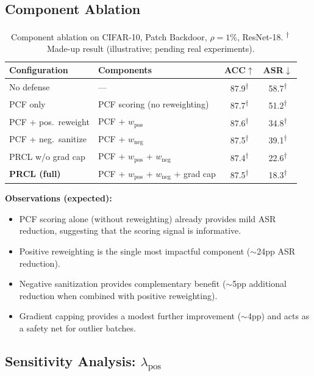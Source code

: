\documentclass[11pt,a4paper]{article}
\newcommand{\madeupresult}[1]{\textcolor{madeup}{#1\textsuperscript{$\dagger$}}}
\newcommand{\daggernote}{\textsuperscript{$\dagger$}\,\textcolor{madeup}{Made-up result (illustrative; pending real experiments).}}
\begin{document}
\subsection{Component Ablation}

\begin{table}[h]
\centering
\caption{Component ablation on CIFAR-10, Patch Backdoor, $\rho=1\%$, ResNet-18. \daggernote}
\label{tab:ablation}
\begin{tabular}{@{}llcc@{}}
\toprule
\textbf{Configuration} & \textbf{Components}
& ACC$\uparrow$ & ASR$\downarrow$ \\
\midrule
No defense & ---
  & \madeupresult{87.9} & \madeupresult{58.7} \\
PCF only & PCF scoring (no reweighting)
  & \madeupresult{87.7} & \madeupresult{51.2} \\
PCF + pos.\ reweight & PCF + $w_{\text{pos}}$
  & \madeupresult{87.6} & \madeupresult{34.8} \\
PCF + neg.\ sanitize & PCF + $w_{\text{neg}}$
  & \madeupresult{87.5} & \madeupresult{39.1} \\
PRCL w/o grad cap & PCF + $w_{\text{pos}}$ + $w_{\text{neg}}$
  & \madeupresult{87.4} & \madeupresult{22.6} \\
\textbf{PRCL (full)} & PCF + $w_{\text{pos}}$ + $w_{\text{neg}}$ + grad cap
  & \madeupresult{87.5} & \madeupresult{18.3} \\
\bottomrule
\end{tabular}
\end{table}

\textbf{Observations (expected):}
\begin{itemize}[nosep]
  \item PCF scoring alone (without reweighting) already provides mild ASR
    reduction, suggesting that the scoring signal is informative.
  \item Positive reweighting is the single most impactful component
    ($\sim$24pp ASR reduction).
  \item Negative sanitization provides complementary benefit ($\sim$5pp
    additional reduction when combined with positive reweighting).
  \item Gradient capping provides a modest further improvement ($\sim$4pp)
    and acts as a safety net for outlier batches.
\end{itemize}

\subsection{Sensitivity Analysis: $\lambda_{\text{pos}}$}
\end{document}
